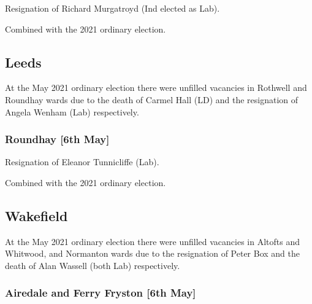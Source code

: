\documentclass[a4paper,openany]{book}
\begin{document}
\begin{resultsiii}

Resignation of Richard Murgatroyd (Ind elected as Lab).

Combined with the 2021 ordinary election.

\subsection*{Leeds}

At the May 2021 ordinary election there were unfilled vacancies in Rothwell and Roundhay wards due to the death of Carmel Hall (LD) and the resignation of Angela Wenham (Lab) respectively.

\subsubsection*{Roundhay \hspace*{\fill}\nolinebreak[1]%
	\enspace\hspace*{\fill}
	[6th May]}


Resignation of Eleanor Tunnicliffe (Lab).

Combined with the 2021 ordinary election.

\subsection*{Wakefield}

At the May 2021 ordinary election there were unfilled vacancies in Altofts and Whitwood, and Normanton wards due to the resignation of Peter Box and the death of Alan Wassell (both Lab) respectively.

\subsubsection*{Airedale and Ferry Fryston \hspace*{\fill}\nolinebreak[1]%
	\enspace\hspace*{\fill}
	[6th May]}



\end{resultsiii}
\end{document}

